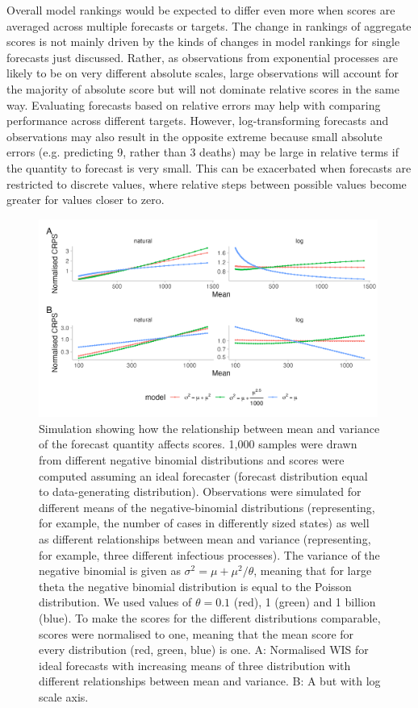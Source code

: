 \documentclass{article}
\begin{document}
Overall model rankings would be expected to differ even more when scores are averaged across multiple forecasts or targets. The change in rankings of aggregate scores is not mainly driven by the kinds of changes in model rankings for single forecasts just discussed. Rather, as observations from exponential processes are likely to be on very different absolute scales, large observations will account for the majority of absolute score but will not dominate relative scores in the same way. Evaluating forecasts based on relative errors may help with comparing performance across different targets. However, log-transforming forecasts and observations may also result in the opposite extreme because small absolute errors (e.g. predicting 9, rather than 3 deaths) may be large in relative terms if the quantity to forecast is very small. This can be exacerbated when forecasts are restricted to discrete values, where relative steps between possible values become greater for values closer to zero. 

\begin{figure}[h!]
    \centering
    \includegraphics[width=0.99\textwidth]{output/figures/SIM-mean-state-size.png}
    \caption{Simulation showing how the relationship between mean and variance of the forecast quantity affects scores. 1,000 samples were drawn from different negative binomial distributions and scores were computed assuming an ideal forecaster (forecast distribution equal to data-generating distribution). Observations were simulated for different means of the negative-binomial distributions (representing, for example, the number of cases in differently sized states) as well as different relationships between mean and variance (representing, for example, three different infectious processes). The variance of the negative binomial is given as $\sigma^2 = \mu + \mu^2 / \theta$, meaning that for large theta the negative binomial distribution is equal to the Poisson distribution. We used values of $\theta = 0.1$ (red), 1 (green) and 1 billion (blue). To make the scores for the different distributions comparable, scores were normalised to one, meaning that the mean score for every distribution (red, green, blue) is one. 
    A: Normalised WIS for ideal forecasts with increasing means of three distribution with different relationships between mean and variance. B: A but with log scale axis.}
    \label{fig:SIM-wis-state-size-mean}
\end{figure}
\end{document}
